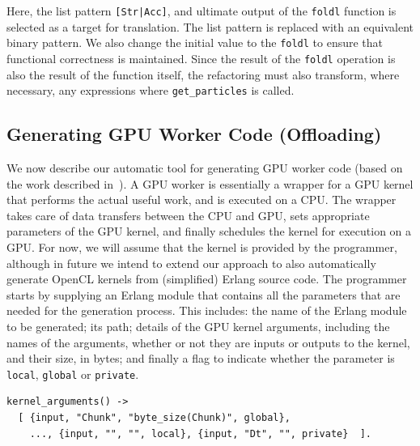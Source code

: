 \documentclass[final]{jfp1}
\begin{document}

\noindent
Here, the list pattern \lstinline{[Str|Acc]}, and ultimate output of the \lstinline{foldl} function is selected as a target for translation. The list pattern is replaced with an equivalent binary pattern. We also change the initial value to the \lstinline{foldl} to ensure that functional correctness is maintained. Since the result of the \lstinline{foldl} operation is also the result of the function itself, the refactoring must also transform, where necessary, any expressions where \lstinline{get_particles} is called.

\subsection{Generating GPU Worker Code (Offloading)}
\label{sec:gpuCodeGen}
We now describe our automatic tool for generating GPU worker code (based on the work described in~\cite{transformationsystem}).
A GPU worker is essentially a wrapper for
a GPU kernel that performs the actual useful work, and is
executed on a CPU.  
The wrapper takes care of data transfers between the CPU and GPU, sets
appropriate parameters of the GPU kernel, and finally schedules the kernel
for execution on a GPU.
For now, we will assume that the kernel is provided by the programmer,
 although in future we intend to extend our approach to also automatically generate OpenCL kernels from (simplified) Erlang source code.
%
The programmer starts by supplying an Erlang module that contains all the
parameters that are needed for the generation process. This includes: the
name of the Erlang module to be generated; its path; details of the
GPU kernel arguments, including the names of the arguments, whether or not
they are inputs or outputs to the kernel, and their size, in bytes;
and finally a flag to indicate whether the parameter is
\lstinline{local}, \lstinline{global} or \lstinline{private}.


\begin{lstlisting}
kernel_arguments() ->
  [ {input, "Chunk", "byte_size(Chunk)", global},
    ..., {input, "", "", local}, {input, "Dt", "", private}  ].
\end{lstlisting}
\end{document}
